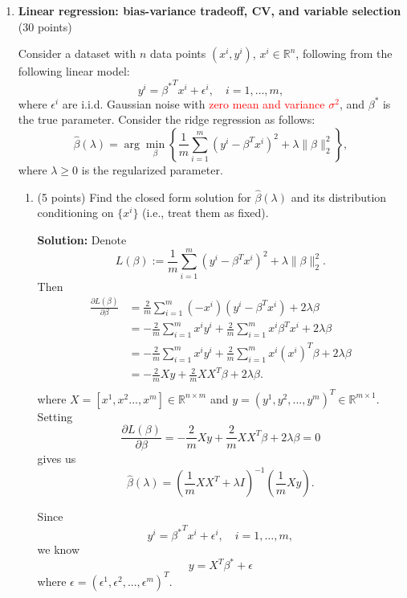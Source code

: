 \documentclass[twoside,10pt]{article}
\begin{document}
\begin{enumerate}
\begin{enumerate}
\end{enumerate}
\clearpage 

\item{\bf Linear regression: bias-variance tradeoff, CV, and variable selection} (30 points)


Consider a dataset with $n$ data points $(x^i, y^i)$, $x^i \in \mathbb R^n$, following from the following linear model:
\[
y^i =  {\beta^*}^T x^i + \epsilon^i, \quad i = 1, \ldots, m,
\]
where $\epsilon^i$ are i.i.d. Gaussian noise with \textcolor{red}{zero mean and variance $\sigma^2$}, and $\beta^*$ is the true parameter. Consider the ridge regression as follows:
\begin{equation} \label{1}
\hat \beta(\lambda) 
= \arg\min_{\beta}
\left\{
\frac 1 m \sum_{i=1}^m (y^i - {\beta}^T x^i)^2 + \lambda \|\beta\|_2^2
\right\},
\end{equation}
where $\lambda \geq 0$ is the regularized parameter. 
\begin{enumerate}
\item (5 points) Find the closed form solution for $\hat \beta(\lambda)$ and its distribution conditioning on $\{x^i\}$ (i.e., treat them as fixed).
\begin{tcolorbox}
\textbf{Solution:} Denote $$L(\beta) := \frac 1 m \sum_{i=1}^m (y^i - {\beta}^T x^i)^2 + \lambda \|\beta\|_2^2.$$
Then 
\begin{align*}
\frac{\partial{L(\beta)}}{\partial \beta} & = \frac 2 m \sum_{i=1}^m (-x^i) (y^i - {\beta}^T x^i)+ 2\lambda \beta \\
& = - \frac 2 m \sum_{i=1}^m x^i y^i  +  \frac 2 m \sum_{i=1}^m x^i {\beta}^T x^i + 2\lambda \beta \\
& = - \frac 2 m \sum_{i=1}^m x^i y^i  +  \frac 2 m \sum_{i=1}^m x^i (x^i)^T {\beta}  + 2\lambda \beta \\
& =  -\frac 2 m Xy + \frac 2 m XX^T \beta + 2\lambda \beta. \\
\end{align*}
where $X = [x^1,x^2 ..., x^m] \in \mathbb{R}^{n\times m}$ and $y = (y^1, y^2, ..., y^m)^T \in \mathbb{R}^{m\times 1}$.\\

Setting $$\frac{\partial{L(\beta)}}{\partial \beta}=-\frac 2 m Xy + \frac 2 m XX^T \beta + 2\lambda \beta  = 0$$
gives us $$\hat{\beta}(\lambda) = \left( \frac 1 m XX^T + \lambda I \right)^{-1} \left(\frac 1 m Xy\right).$$

Since $$y^i =  {\beta^*}^T x^i + \epsilon^i, \quad i = 1, \ldots, m,$$
we know $$y = X^T \beta^* + \epsilon$$
where $\epsilon = (\epsilon^1, \epsilon^2, ..., \epsilon^m)^T.$


\end{tcolorbox}
\end{enumerate}
\end{enumerate}
\end{document}
